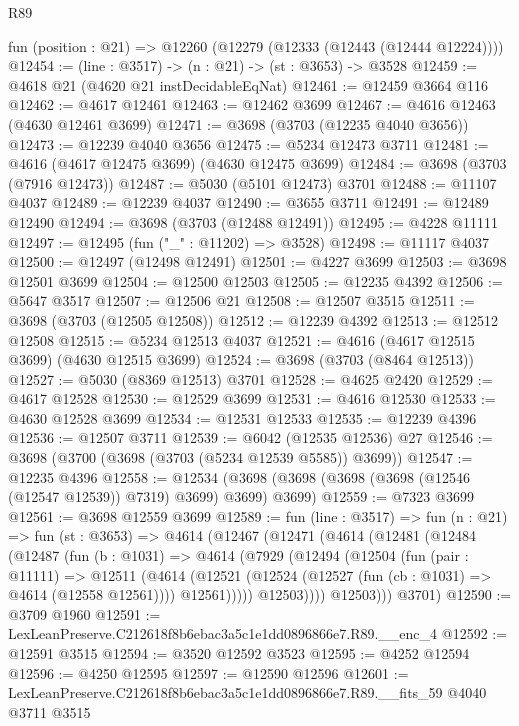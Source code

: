 \begin{lexlean}{R89}
\begin{coremodule}
  fun (position : @21) => @12260 (@12279 (@12333 (@12443 (@12444 @12224))))
@12454 := (line : @3517) -> (n : @21) -> (st : @3653) -> @3528
@12459 := @4618 @21 (@4620 @21 instDecidableEqNat)
@12461 := @12459 @3664 @116
@12462 := @4617 @12461
@12463 := @12462 @3699
@12467 := @4616 @12463 (@4630 @12461 @3699)
@12471 := @3698 (@3703 (@12235 @4040 @3656))
@12473 := @12239 @4040 @3656
@12475 := @5234 @12473 @3711
@12481 := @4616 (@4617 @12475 @3699) (@4630 @12475 @3699)
@12484 := @3698 (@3703 (@7916 @12473))
@12487 := @5030 (@5101 @12473) @3701
@12488 := @11107 @4037
@12489 := @12239 @4037
@12490 := @3655 @3711
@12491 := @12489 @12490
@12494 := @3698 (@3703 (@12488 @12491))
@12495 := @4228 @11111
@12497 := @12495 (fun ("_" : @11202) => @3528)
@12498 := @11117 @4037
@12500 := @12497 (@12498 @12491)
@12501 := @4227 @3699
@12503 := @3698 @12501 @3699
@12504 := @12500 @12503
@12505 := @12235 @4392
@12506 := @5647 @3517
@12507 := @12506 @21
@12508 := @12507 @3515
@12511 := @3698 (@3703 (@12505 @12508))
@12512 := @12239 @4392
@12513 := @12512 @12508
@12515 := @5234 @12513 @4037
@12521 := @4616 (@4617 @12515 @3699) (@4630 @12515 @3699)
@12524 := @3698 (@3703 (@8464 @12513))
@12527 := @5030 (@8369 @12513) @3701
@12528 := @4625 @2420
@12529 := @4617 @12528
@12530 := @12529 @3699
@12531 := @4616 @12530
@12533 := @4630 @12528 @3699
@12534 := @12531 @12533
@12535 := @12239 @4396
@12536 := @12507 @3711
@12539 := @6042 (@12535 @12536) @27
@12546 := @3698 (@3700 (@3698 (@3703 (@5234 @12539 @5585)) @3699))
@12547 := @12235 @4396
@12558 := @12534 (@3698 (@3698 (@3698 (@3698 (@12546 (@12547 @12539)) @7319) @3699) @3699) @3699)
@12559 := @7323 @3699
@12561 := @3698 @12559 @3699
@12589 := fun (line : @3517) =>
  fun (n : @21) =>
  fun (st : @3653) =>
  @4614
    (@12467
      (@12471
        (@4614
          (@12481
            (@12484
              (@12487
                (fun (b : @1031) =>
                @4614
                  (@7929
                    (@12494
                      (@12504
                        (fun (pair : @11111) =>
                        @12511
                          (@4614
                            (@12521
                              (@12524 (@12527 (fun (cb : @1031) => @4614 (@12558 @12561))))
                              @12561)))))
                    @12503))))
            @12503)))
      @3701)
@12590 := @3709 @1960
@12591 := LexLeanPreserve.C212618f8b6ebac3a5c1e1dd0896866e7.R89.__enc_4
@12592 := @12591 @3515
@12594 := @3520 @12592 @3523
@12595 := @4252 @12594
@12596 := @4250 @12595
@12597 := @12590 @12596
@12601 := LexLeanPreserve.C212618f8b6ebac3a5c1e1dd0896866e7.R89.__fits_59 @4040 @3711 @3515

\end{coremodule}
\end{lexlean}

